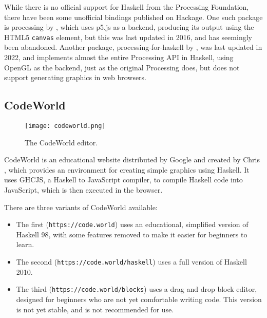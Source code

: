 \documentclass[../main.tex]{subfiles}
\begin{document}
            While there is no official support for Haskell from the Processing Foundation,
                there have been some unofficial bindings published on Hackage.
            One such package is processing by \citet{hackageProcessing}, which uses p5.js
                as a backend, producing its output using the HTML5 \texttt{canvas} element, but
                this was last updated in 2016, and has seemingly been abandoned.
            Another package, processing-for-haskell by \citet{hackageProcessingForHaskell},
                was last updated in 2022, and implements almost the entire Processing API in
                Haskell, using OpenGL as the backend, just as the original Processing does, but
                does not support generating graphics in web browsers.

        \subsection{CodeWorld}
            \begin{figure}[H]
                \centering
                \texttt{[image: codeworld.png]}
                    \caption{The CodeWorld editor.}
                    \label{fig:codeworld}
            \end{figure}

            CodeWorld is an educational website distributed by Google and created by Chris
                \citet{codeWorldGitHub}, which provides an environment for creating simple
                graphics using Haskell.
            It uses GHCJS, a Haskell to JavaScript compiler, to compile Haskell code into
                JavaScript, which is then executed in the browser.

            There are three variants of CodeWorld available:
            \begin{itemize}
                \item The first (\texttt{https://code.world}) uses an educational, simplified
                      version of Haskell 98, with some features removed to make it easier for
                      beginners to learn.
                \item The second (\texttt{https://code.world/haskell}) uses a full version of
                      Haskell 2010.
                \item The third (\texttt{https://code.world/blocks}) uses a drag and drop block
                      editor, designed for beginners who are not yet comfortable writing code.
                      This version is not yet stable, and is not recommended for use.
            \end{itemize}
\end{document}

